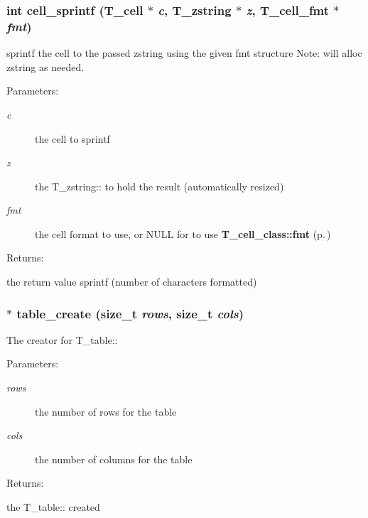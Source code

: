 \subsubsection{\setlength{\rightskip}{0pt plus 5cm}int cell\_\-sprintf ({\bf T\_\-cell} $\ast$ {\em c}, {\bf T\_\-zstring} $\ast$ {\em z}, {\bf T\_\-cell\_\-fmt} $\ast$ {\em fmt})}\label{table_8h_a26}


sprintf the cell to the passed zstring using the given fmt structure Note: will alloc zstring as needed. \begin{Desc}
\item[Parameters: ]\par
\begin{description}
\item[{\em 
c}]the cell to sprintf \item[{\em 
z}]the T\_\-zstring:: to hold the result (automatically resized) \item[{\em 
fmt}]the cell format to use, or NULL for to use {\bf T\_\-cell\_\-class::fmt} {\rm (p.\,\pageref{structS__cell__class_m0})} \end{description}
\end{Desc}
\begin{Desc}
\item[Returns: ]\par
the return value sprintf (number of characters formatted) \end{Desc}
\subsubsection{$\ast$ table\_\-create (size\_\-t {\em rows}, size\_\-t {\em cols})}\label{table_8h_a27}


The creator for T\_\-table::\begin{Desc}
\item[Parameters: ]\par
\begin{description}
\item[{\em 
rows}]the number of rows for the table \item[{\em 
cols}]the number of columns for the table \end{description}
\end{Desc}
\begin{Desc}
\item[Returns: ]\par
the T\_\-table:: created \end{Desc}
